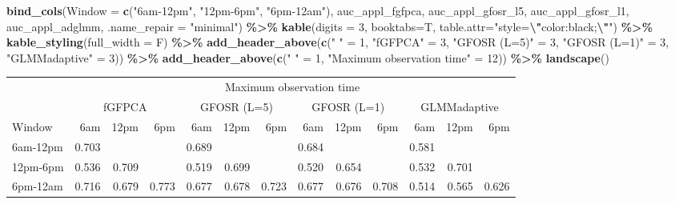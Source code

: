 \documentclass[
]{article}
\newenvironment{Shaded}{\begin{snugshade}}{\end{snugshade}}
\newcommand{\AttributeTok}[1]{\textcolor[rgb]{0.13,0.29,0.53}{#1}}
\newcommand{\DecValTok}[1]{\textcolor[rgb]{0.00,0.00,0.81}{#1}}
\newcommand{\FunctionTok}[1]{\textcolor[rgb]{0.13,0.29,0.53}{\textbf{#1}}}
\newcommand{\NormalTok}[1]{#1}
\newcommand{\OtherTok}[1]{\textcolor[rgb]{0.56,0.35,0.01}{#1}}
\newcommand{\SpecialCharTok}[1]{\textcolor[rgb]{0.81,0.36,0.00}{\textbf{#1}}}
\newcommand{\StringTok}[1]{\textcolor[rgb]{0.31,0.60,0.02}{#1}}
\begin{document}
\begin{Shaded}
\begin{Highlighting}[]
\FunctionTok{bind\_cols}\NormalTok{(}\AttributeTok{Window =} \FunctionTok{c}\NormalTok{(}\StringTok{"6am{-}12pm"}\NormalTok{, }\StringTok{"12pm{-}6pm"}\NormalTok{, }\StringTok{"6pm{-}12am"}\NormalTok{),}
\NormalTok{          auc\_appl\_fgfpca, auc\_appl\_gfosr\_l5, auc\_appl\_gfosr\_l1, auc\_appl\_adglmm,}
          \AttributeTok{.name\_repair =} \StringTok{"minimal"}\NormalTok{) }\SpecialCharTok{\%\textgreater{}\%}
  \FunctionTok{kable}\NormalTok{(}\AttributeTok{digits =} \DecValTok{3}\NormalTok{, }\AttributeTok{booktabs=}\NormalTok{T,}
        \AttributeTok{table.attr=}\StringTok{"style=}\SpecialCharTok{\textbackslash{}"}\StringTok{color:black;}\SpecialCharTok{\textbackslash{}"}\StringTok{"}\NormalTok{) }\SpecialCharTok{\%\textgreater{}\%}
  \FunctionTok{kable\_styling}\NormalTok{(}\AttributeTok{full\_width =}\NormalTok{ F) }\SpecialCharTok{\%\textgreater{}\%} 
  \FunctionTok{add\_header\_above}\NormalTok{(}\FunctionTok{c}\NormalTok{(}\StringTok{" "} \OtherTok{=} \DecValTok{1}\NormalTok{, }\StringTok{"fGFPCA"} \OtherTok{=} \DecValTok{3}\NormalTok{, }\StringTok{"GFOSR (L=5)"} \OtherTok{=} \DecValTok{3}\NormalTok{, }
                     \StringTok{"GFOSR (L=1)"} \OtherTok{=} \DecValTok{3}\NormalTok{, }\StringTok{"GLMMadaptive"} \OtherTok{=} \DecValTok{3}\NormalTok{)) }\SpecialCharTok{\%\textgreater{}\%}
  \FunctionTok{add\_header\_above}\NormalTok{(}\FunctionTok{c}\NormalTok{(}\StringTok{" "} \OtherTok{=} \DecValTok{1}\NormalTok{, }\StringTok{"Maximum observation time"} \OtherTok{=} \DecValTok{12}\NormalTok{)) }\SpecialCharTok{\%\textgreater{}\%}
  \FunctionTok{landscape}\NormalTok{()}
\end{Highlighting}
\end{Shaded}

\begin{landscape}\begin{table}
\centering
\begin{tabular}{lrrrrrrrrrrrr}
\toprule
\multicolumn{1}{c}{ } & \multicolumn{12}{c}{Maximum observation time} \\
\cmidrule(l{3pt}r{3pt}){2-13}
\multicolumn{1}{c}{ } & \multicolumn{3}{c}{fGFPCA} & \multicolumn{3}{c}{GFOSR (L=5)} & \multicolumn{3}{c}{GFOSR (L=1)} & \multicolumn{3}{c}{GLMMadaptive} \\
\cmidrule(l{3pt}r{3pt}){2-4} \cmidrule(l{3pt}r{3pt}){5-7} \cmidrule(l{3pt}r{3pt}){8-10} \cmidrule(l{3pt}r{3pt}){11-13}
Window & 6am & 12pm & 6pm & 6am & 12pm & 6pm & 6am & 12pm & 6pm & 6am & 12pm & 6pm\\
\midrule
6am-12pm & 0.703 &  &  & 0.689 &  &  & 0.684 &  &  & 0.581 &  & \\
12pm-6pm & 0.536 & 0.709 &  & 0.519 & 0.699 &  & 0.520 & 0.654 &  & 0.532 & 0.701 & \\
6pm-12am & 0.716 & 0.679 & 0.773 & 0.677 & 0.678 & 0.723 & 0.677 & 0.676 & 0.708 & 0.514 & 0.565 & 0.626\\
\bottomrule
\end{tabular}
\end{table}
\end{landscape}
\end{document}
